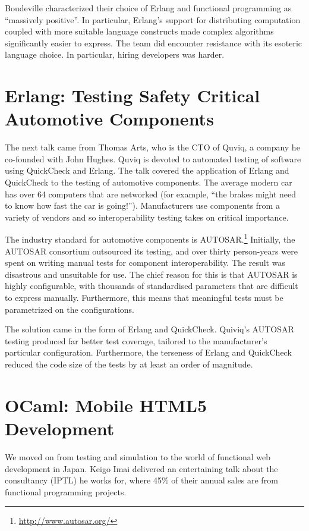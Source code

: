 \documentclass{jfp1}
\begin{document}
Boudeville characterized their choice of Erlang and functional programming as
``massively positive''.  In particular, Erlang's support for distributing
computation coupled with more suitable language constructs made complex
algorithms significantly easier to express.  The team did encounter resistance
with its esoteric language choice.  In particular, hiring developers was
harder.

\section{Erlang: Testing Safety Critical Automotive Components}

The next talk came from Thomas Arts, who is the CTO of Quviq, a company he co-founded with
John Hughes. Quviq is devoted to automated testing of software using
QuickCheck and Erlang.  The talk covered the application of Erlang and
QuickCheck to the testing of automotive components.  The average modern car has
over 64 computers that are networked (for example, ``the brakes might need to know how fast
the car is going!'').  Manufacturers use components from a variety of vendors
and so interoperability testing takes on critical importance.

The industry standard for automotive components is
AUTOSAR.\footnote{\url{http://www.autosar.org/}} Initially, the AUTOSAR
consortium outsourced its testing, and over thirty person-years were spent on
writing manual tests for component interoperability.  The result was disastrous
and unsuitable for use.  The chief reason for this is that AUTOSAR is highly
configurable, with thousands of standardised parameters that are difficult to
express manually.  Furthermore, this means that meaningful tests must be
parametrized on the configurations.

The solution came in the form of Erlang and QuickCheck.  Quiviq's AUTOSAR
testing produced far better test coverage, tailored to the manufacturer's
particular configuration.  Furthermore, the terseness of Erlang and QuickCheck
reduced the code size of the tests by at least an order of magnitude.

\section{OCaml: Mobile HTML5 Development}

We moved on from testing and simulation to the world of functional web
development in Japan. Keigo Imai delivered an entertaining talk about the
consultancy (IPTL) he works for, where 45\% of their annual sales are from
functional programming projects.
\end{document}
